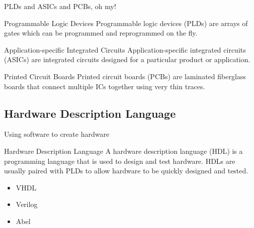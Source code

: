\begin{frame}{PLDs and ASICs and PCBs, oh my!}
  \begin{block}{Programmable Logic Devices}
    Programmable logic devices (\alert{PLDs}) are arrays of gates which can be programmed and reprogrammed on the fly.
  \end{block}
  \begin{block}{Application-specific Integrated Circuits}
    Application-specific integrated circuits (\alert{ASICs}) are integrated circuits designed for a particular product or application.
  \end{block}
  \begin{block}{Printed Circuit Boards}
    Printed circuit boards (\alert{PCBs}) are laminated fiberglass boards that connect multiple ICs together using very thin traces.
  \end{block}
\end{frame}

\subsection{Hardware Description Language}

\begin{frame}{Using software to create hardware}
  \begin{block}{Hardware Description Language}
    A hardware description language (\alert{HDL}) is a programming language that is used to design and test hardware.  HDLs are usually paired with PLDs to allow hardware to be quickly designed and tested.
  \end{block}
  \begin{itemize}
    \item VHDL
    \item Verilog
    \item Abel
  \end{itemize}
\end{frame}


